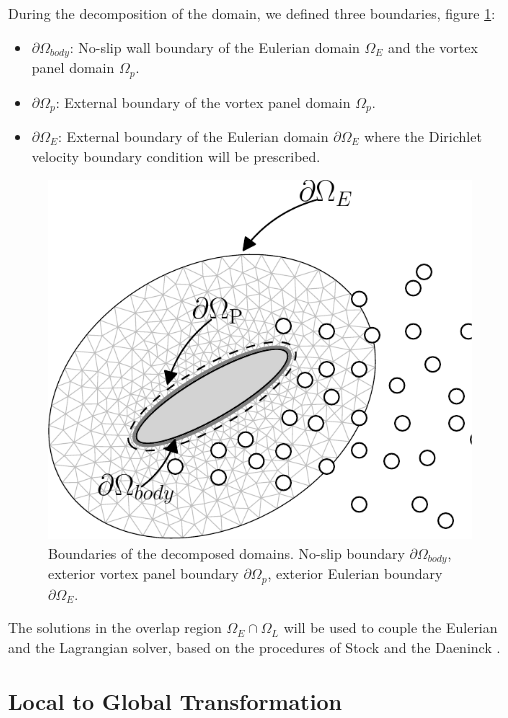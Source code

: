 During the decomposition of the domain, we defined three boundaries, figure \ref{fig:hybrid_config}:
\begin{itemize}
\item $\partial \Omega_{body}$: No-slip wall boundary of the Eulerian domain $\Omega_E$ and the vortex panel domain $\Omega_p$.
\item $\partial \Omega_{p}$: External boundary of the vortex panel domain $\Omega_p$. 
\item $\partial \Omega_E$: External boundary of the Eulerian domain $\partial \Omega_{E}$ where the Dirichlet velocity boundary condition will be prescribed.
\end{itemize}	

	
	\begin{figure}[t]
	\centering
	\includegraphics[width=0.5\linewidth]{./figures/hybrid/interpolation/ellipse/hybrid-crop.pdf}
	\caption{Boundaries of the decomposed domains. No-slip boundary $\partial \Omega_{body}$, exterior vortex panel boundary $\partial \Omega_p$, exterior Eulerian boundary $\partial \Omega_E$.}
	\label{fig:hybrid_config}
	\end{figure}		

The solutions in the overlap region $\Omega_E \cap \Omega_L$ will be used to couple the Eulerian and the Lagrangian solver, based on the procedures of Stock \cite{Stock2010a} and the Daeninck \cite{Daeninck2006}.

\subsection{Local to Global Transformation}

